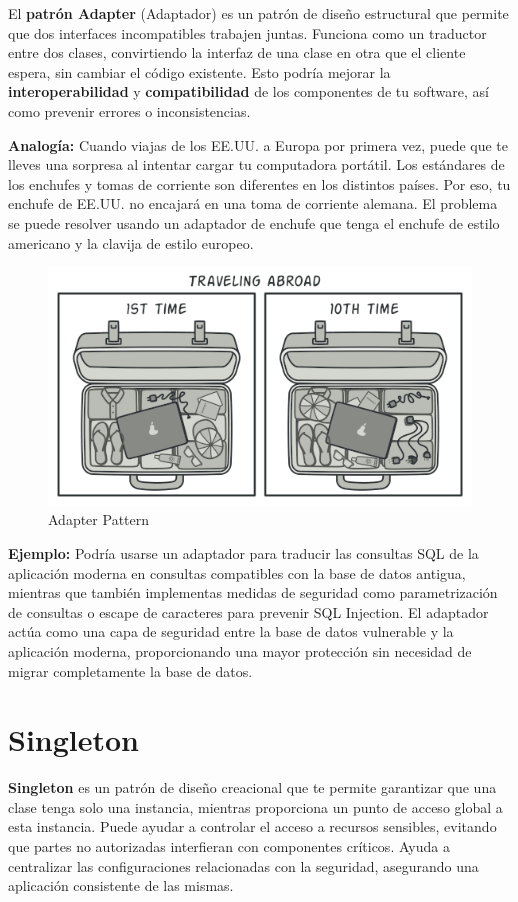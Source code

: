 El \textbf{patrón Adapter} (Adaptador) es un patrón de diseño estructural que permite que dos interfaces incompatibles trabajen juntas. Funciona como un traductor entre dos clases, convirtiendo la interfaz de una clase en otra que el cliente espera, sin cambiar el código existente. Esto podría mejorar la \textbf{interoperabilidad} y \textbf{compatibilidad} de los componentes de tu software, así como prevenir errores o inconsistencias. 

\textbf{Analogía: }Cuando viajas de los EE.UU. a Europa por primera vez, puede que te lleves una sorpresa al intentar cargar tu computadora portátil. Los estándares de los enchufes y tomas de corriente son diferentes en los distintos países. Por eso, tu enchufe de EE.UU. no encajará en una toma de corriente alemana. El problema se puede resolver usando un adaptador de enchufe que tenga el enchufe de estilo americano y la clavija de estilo europeo.

\begin{figure}[H]
    \centering
    \includegraphics[width=0.5\linewidth]{PatronesSoftware/adapter.png}
    \caption{Adapter Pattern}
    \label{fig:adapter-pattern}
\end{figure}

\textbf{Ejemplo:} Podría usarse un adaptador para traducir las consultas SQL de la aplicación moderna en consultas compatibles con la base de datos antigua, mientras que también implementas medidas de seguridad como parametrización de consultas o escape de caracteres para prevenir SQL Injection. El adaptador actúa como una capa de seguridad entre la base de datos vulnerable y la aplicación moderna, proporcionando una mayor protección sin necesidad de migrar completamente la base de datos.

\section{Singleton}

\textbf{Singleton} es un patrón de diseño creacional que te permite garantizar que una clase tenga solo una instancia, mientras proporciona un punto de acceso global a esta instancia. Puede ayudar a controlar el acceso a recursos sensibles, evitando que partes no autorizadas interfieran con componentes críticos. Ayuda a centralizar las configuraciones relacionadas con la seguridad, asegurando una aplicación consistente de las mismas. 

